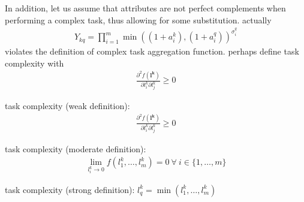 {\begin{axiom}
        In addition, let us assume that attributes are not perfect complements when performing a complex task, thus allowing for some substitution.
        actually 
        \begin{gather}
            Y_{kq} = 
            \prod_{i=1}^{m}{
                \min(
                    (1 + a_{i}^{k}),
                    (1 + a_{i}^{q})
                ) ^ {\sigma_{i}^{q}}
            }
        \end{gather}
        violates the definition of complex task aggregation function.
        perhaps define task complexity with 
        \begin{gather}
            \frac{
                \partial ^ 2 {f(\boldsymbol{l^{k}})}
            }{
                \partial 
                l_{i}^{k}
                \partial
                l_{j}^{k}
            } \geq 0
        \end{gather}

        task complexity (weak definition): 
        \begin{gather}
            \frac{
                \partial ^ 2 {f(\boldsymbol{l^{k}})}
            }{
                \partial 
                l_{i}^{k}
                \partial
                l_{j}^{k}
            } \geq 0
        \end{gather}
        
        task complexity (moderate definition): 
        \begin{gather}
            \lim_{
                l_{i}^{k} \rightarrow 0
            }{
                f(l_{1}^{k}, \dots, l_{m}^{k})
            } = 0
            \
            \forall 
            \
            i \in \{1, \dots, m\}
        \end{gather}

        task complexity (strong definition): $l_{q}^{k} = \min(l_{1}^{k}, \dots, l_{m}^{k})$
    \end{axiom}

}


\newcommand{\ORA}{
    \label{ora}

    \begin{axiom}[Occupational Reducibility Axiom]
        Occupations can be reduced to their tasks.
    \end{axiom}

}



